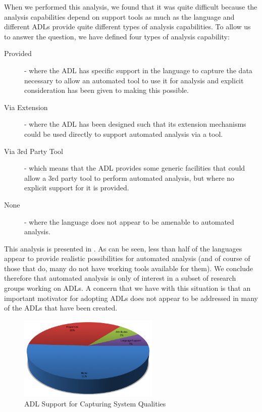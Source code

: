 When we performed this analysis, we found that it was quite difficult because the analysis capabilities depend on support tools as much as the language and different ADLs provide quite different types of analysis capabilities.  To allow us to answer the question, we have defined four types of analysis capability:
\begin{description}
	\item [Provided] - where the ADL has specific support in the language to capture the data necessary to allow an automated tool to use it for analysis and explicit consideration has been given to making this possible.
	\item[Via Extension] - where the ADL has been designed such that its extension mechanisms could be used directly to support automated analysis via a tool.
	\item[Via 3rd Party Tool] - which means that the ADL provides some generic facilities that could allow a 3rd party tool to perform automated analysis, but where no explicit support for it is provided.
	\item[None] - where the language does not appear to be amenable to automated analysis.
\end{description}

This analysis is presented in .  As can be seen, less than half of the languages appear to provide realistic possibilities for automated analysis (and of course of those that do, many do not have working tools available for them).  We conclude therefore that automated analysis is only of interest in a subset of research groups working on ADLs.  A concern that we have with this situation is that an important motivator for adopting ADLs does not appear to be addressed in many of the ADLs that have been created.

\begin{figure}
\centering
\includegraphics[width=0.6\textwidth]{Figures/litreview-adl-qualities}
\caption{ADL Support for Capturing System Qualities}
\label{figure:litreview-adl-qualities}
\end{figure}

